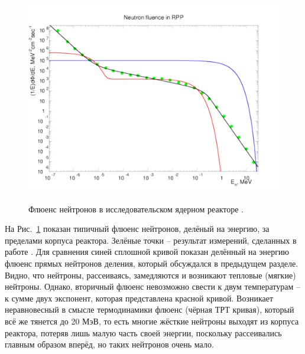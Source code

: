 \documentclass[a4paper,12pt]{article}
\begin{document}
\begin{large}
  \begin{figure}[ht]
    {
       \includegraphics[width=0.90\linewidth]{images/nspec_rpp}
    }
    \caption{Флюенс нейтронов в исследовательском ядерном реакторе \cite{Aldrich83}.}
    \label{fig:SpecRPP}
  \end{figure}
  На Рис.~\ref{fig:SpecRPP} показан типичный флюенс нейтронов, делёный на энергию, за пределами корпуса реактора.
  Зелёные точки -- результат измерений, сделанных в работе \cite{Aldrich83}.
  Для сравнения синей сплошной кривой показан делённый на энергию флюенс прямых нейтронов деления, который обсуждался в предыдущем разделе.
  Видно, что нейтроны, рассеиваясь, замедляются и возникают тепловые (мягкие) нейтроны.
  Однако, вторичный флюенс невозможно свести к двум температурам -- к сумме двух экспонент, которая представлена красной кривой.
  Возникает неравновесный в смысле термодинамики флюенс (чёрная ТРТ кривая), который всё же тянется до 20 МэВ, то есть многие жёсткие нейтроны выходят из корпуса реактора, потеряв лишь малую часть своей энергии, поскольку рассеивались главным образом вперёд, но таких нейтронов очень мало.


\end{large}
\end{document}
